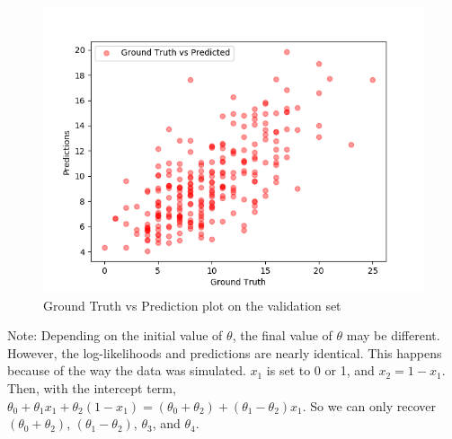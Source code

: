 \begin{answer}
	\begin{figure}[H]
		\centering
		\vspace{-2mm}
		\includegraphics[width=0.65\linewidth]{../src/poisson/poisson_valid.png}
		\caption{Ground Truth vs Prediction plot on the validation set}
	\end{figure}


Note: Depending on the initial value of $\theta$, the final value of $\theta$ may be different. However, the log-likelihoods and predictions are nearly identical. This happens because of the way the data was simulated. $x_1$ is set to 0 or 1, and $x_2 = 1 - x_1$. Then, with the intercept term, $\theta_0 + \theta_1 x_1 + \theta_2 (1-x_1) = (\theta_0 + \theta_2) + (\theta_1 - \theta_2) x_1$. So we can only recover $(\theta_0 + \theta_2)$, $(\theta_1 - \theta_2)$, $\theta_3$, and $\theta_4$.

\end{answer}
